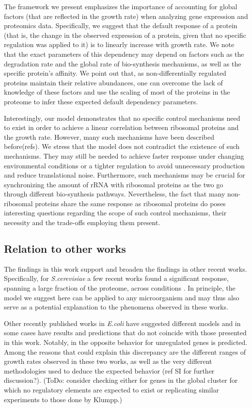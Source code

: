 \documentclass[notitlepage]{article}
\begin{document}
The framework we present emphasizes the importance of accounting for global factors (that are reflected in the growth rate) when analyzing gene expression and proteomics data.
Specifically, we suggest that the default response of a protein (that is, the change in the observed expression of a protein, given that no specific regulation was applied to it) is to linearly increase with growth rate.
We note that the exact parameters of this dependency may depend on factors such as the degradation rate and the global rate of bio-synthesis mechanisms, as well as the specific protein's affinity.
We point out that, as non-differentially regulated proteins maintain their relative abundances, one can overcome the lack of knowledge of these factors and use the scaling of most of the proteins in the proteome to infer these expected default dependency parameters.

Interestingly, our model demonstrates that no specific control mechanisms need to exist in order to achieve a linear correlation between ribosomal proteins and the growth rate.
However, many such mechanisms have been described before(refs).
We stress that the model does not contradict the existence of such mechanisms.
They may still be needed to achieve faster response under changing environmental conditions or a tighter regulation to avoid unnecessary production and reduce translational noise.
Furthermore, such mechanisms may be crucial for synchronizing the amount of rRNA with ribosomal proteins as the two go through different bio-synthesis pathways.
Nevertheless, the fact that many non-ribosomal proteins share the same response as ribosomal proteins do poses interesting questions regarding the scope of such control mechanisms, their necessity and the trade-offs employing them present.

\subsection{Relation to other works}
The findings in this work support and broaden the findings in other recent works.
Specifically, for \emph{S.cerevisiae} a few recent works found a significant response, spanning a large fraction of the proteome, across conditions \parencite{Keren2013a, Gasch2000, Brauer2008a}.
In principle, the model we suggest here can be applied to any microorganism and may thus also serve as a potential explanation to the phenomena observed in these works.

Other recently published works in \emph{E.coli} have suggested different models and in some cases have results  and predictions that do not coincide with those presented in this work.
Notably, in \parencite{Klumpp2009a} the opposite behavior for unregulated genes is predicted.
Among the reasons that could explain this discrepancy are the different ranges of growth rates observed in these two works, as well as the very different methodologies used to deduce the expected behavior (ref SI for further discussion?).
(ToDo: consider checking either for genes in the global cluster for which no regulatory elements are expected to exist or replicating similar experiments to those done by Klumpp.) 
\end{document}
